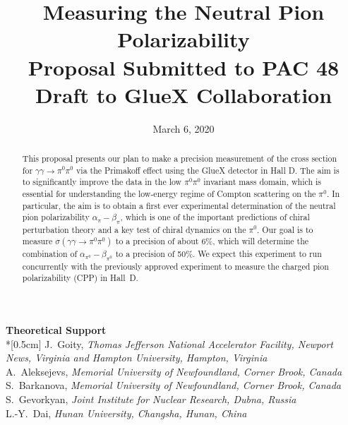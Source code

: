 \documentclass[letterpaper,12pt]{article}
\date{March 6, 2020}
\title{\Large \textbf{Measuring the Neutral Pion Polarizability}\\
\large{Proposal Submitted to PAC 48} \\
\large{ Draft to GlueX Collaboration}
}
\begin{document}
\setlength{\parindent}{2em}


\maketitle

\thispagestyle{empty}

\vspace{3cm}
{\large\textbf {Theoretical Support}} \\*[0.5cm]
\small{J.~Goity, \textit{Thomas Jefferson National Accelerator Facility, Newport News, Virginia and Hampton University, Hampton, Virginia}\\
A.~Aleksejevs,  \textit{Memorial University of Newfoundland, Corner Brook, Canada}\\
S.~Barkanova,  \textit{Memorial University of Newfoundland, Corner Brook, Canada}\\
S.~Gevorkyan,  \textit{Joint Institute for Nuclear Research, Dubna, Russia}\\
L.-Y.~Dai,  \textit{Hunan University, Changsha, Hunan, China}
}



\begin{abstract}
This proposal presents our plan to make a precision measurement of the
cross section for $\gamma \gamma \rightarrow \pi^0 \pi^0$ via the
Primakoff effect using the GlueX detector in Hall D. The aim is to
significantly improve the data in the low $\pi^0\pi^0$ invariant mass
domain, which is essential for understanding the low-energy regime of
Compton scattering on the $\pi^0$. In particular, the aim is to obtain
a first ever experimental determination of the neutral pion
polarizability $\alpha_\pi - \beta_\pi$, which is one of the important
predictions of chiral perturbation theory and a key test of chiral
dynamics on the $\pi^0$.  Our goal is to measure
$\sigma(\gamma\gamma\rightarrow\pi^0\pi^0)$ to a precision of about
6\%, which will determine the combination of
$\alpha_{\pi^0}-\beta_{\pi^0}$ to a precision of 50\%. We expect this
experiment to run concurrently with the previously approved experiment
to measure the charged pion polarizability (CPP) \cite{CPPexp} in
Hall~D.
\end{abstract}
\end{document}
